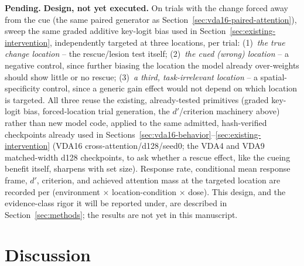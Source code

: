 \documentclass[11pt,a4paper]{article}
\newcommand{\pending}[1]{\par\smallskip\noindent\colorbox{VdaLight}{\parbox{0.96\linewidth}{\textbf{Pending.} #1}}\par\smallskip}
\begin{document}
\pending{\textbf{Design, not yet executed.} On trials with the change forced away from the cue (the same paired generator as Section~\ref{sec:vda16-paired-attention}), sweep the same graded additive key-logit bias used in Section~\ref{sec:existing-intervention}, independently targeted at three locations, per trial: (1)~\emph{the true change location} -- the rescue/lesion test itself; (2)~\emph{the cued (wrong) location} -- a negative control, since further biasing the location the model already over-weights should show little or no rescue; (3)~\emph{a third, task-irrelevant location} -- a spatial-specificity control, since a generic gain effect would not depend on which location is targeted. All three reuse the existing, already-tested primitives (graded key-logit bias, forced-location trial generation, the $d'$/criterion machinery above) rather than new model code, applied to the same admitted, hash-verified checkpoints already used in Sections~\ref{sec:vda16-behavior}--\ref{sec:existing-intervention} (VDA16 cross-attention/d128/seed0; the VDA4 and VDA9 matched-width d128 checkpoints, to ask whether a rescue effect, like the cueing benefit itself, sharpens with set size). Response rate, conditional mean response frame, $d'$, criterion, and achieved attention mass at the targeted location are recorded per (environment $\times$ location-condition $\times$ dose). This design, and the evidence-class rigor it will be reported under, are described in Section~\ref{sec:methods}; the results are not yet in this manuscript.}

\section{Discussion}\label{sec:discussion}
\end{document}

